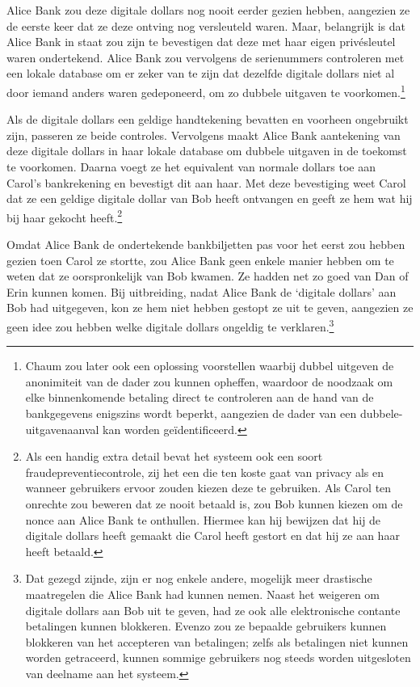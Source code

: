 \documentclass[smalldemyvopaper,11pt,twoside,onecolumn,openright,extrafontsizes,hidelinks]{memoir}
\begin{document}
Alice Bank zou deze digitale dollars nog nooit eerder gezien hebben,
aangezien ze de eerste keer dat ze deze ontving nog versleuteld waren.
Maar, belangrijk is dat Alice Bank in staat zou zijn te bevestigen dat
deze met haar eigen privésleutel waren ondertekend. Alice Bank zou
vervolgens de serienummers controleren met een lokale database om er
zeker van te zijn dat dezelfde digitale dollars niet al door iemand
anders waren gedeponeerd, om zo dubbele uitgaven te
voorkomen.\footnote{Chaum zou later ook een oplossing voorstellen
  waarbij dubbel uitgeven de anonimiteit van de dader zou kunnen
  opheffen, waardoor de noodzaak om elke binnenkomende betaling direct
  te controleren aan de hand van de bankgegevens enigszins wordt
  beperkt, aangezien de dader van een dubbele-uitgavenaanval kan worden
  geïdentificeerd.}

Als de digitale dollars een geldige handtekening bevatten en voorheen
ongebruikt zijn, passeren ze beide controles. Vervolgens maakt Alice
Bank aantekening van deze digitale dollars in haar lokale database om
dubbele uitgaven in de toekomst te voorkomen. Daarna voegt ze het
equivalent van normale dollars toe aan Carol's bankrekening en bevestigt
dit aan haar. Met deze bevestiging weet Carol dat ze een geldige
digitale dollar van Bob heeft ontvangen en geeft ze hem wat hij bij haar
gekocht heeft.\footnote{Als een handig extra detail bevat het systeem
  ook een soort fraudepreventiecontrole, zij het een die ten koste gaat
  van privacy als en wanneer gebruikers ervoor zouden kiezen deze te
  gebruiken. Als Carol ten onrechte zou beweren dat ze nooit betaald is,
  zou Bob kunnen kiezen om de nonce aan Alice Bank te onthullen. Hiermee
  kan hij bewijzen dat hij de digitale dollars heeft gemaakt die Carol
  heeft gestort en dat hij ze aan haar heeft betaald.}

Omdat Alice Bank de ondertekende bankbiljetten pas voor het eerst zou
hebben gezien toen Carol ze stortte, zou Alice Bank geen enkele manier
hebben om te weten dat ze oorspronkelijk van Bob kwamen. Ze hadden net
zo goed van Dan of Erin kunnen komen. Bij uitbreiding, nadat Alice Bank
de `digitale dollars' aan Bob had uitgegeven, kon ze hem niet hebben
gestopt ze uit te geven, aangezien ze geen idee zou hebben welke
digitale dollars ongeldig te verklaren.\footnote{Dat gezegd zijnde, zijn
  er nog enkele andere, mogelijk meer drastische maatregelen die Alice
  Bank had kunnen nemen. Naast het weigeren om digitale dollars aan Bob
  uit te geven, had ze ook alle elektronische contante betalingen kunnen
  blokkeren. Evenzo zou ze bepaalde gebruikers kunnen blokkeren van het
  accepteren van betalingen; zelfs als betalingen niet kunnen worden
  getraceerd, kunnen sommige gebruikers nog steeds worden uitgesloten
  van deelname aan het systeem.}
\end{document}
